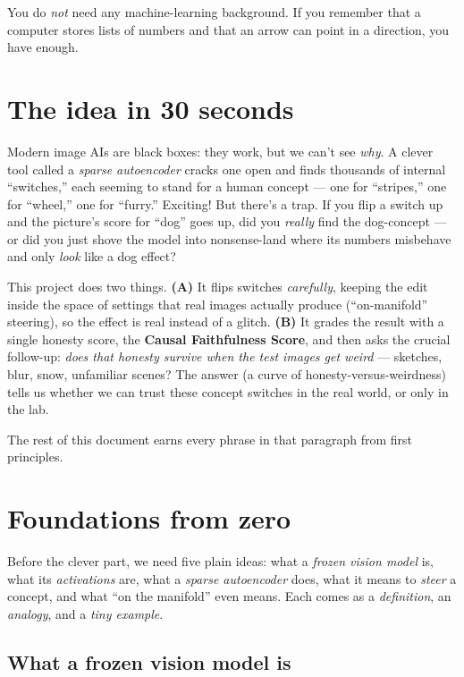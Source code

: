 \documentclass[12pt]{article}
\begin{document}
You do \emph{not} need any machine-learning background. If you remember that a computer stores lists of numbers and that an arrow can point in a direction, you have enough.

\section{The idea in 30 seconds}

Modern image AIs are black boxes: they work, but we can't see \emph{why}. A clever tool called a \emph{sparse autoencoder} cracks one open and finds thousands of internal ``switches,'' each seeming to stand for a human concept --- one for ``stripes,'' one for ``wheel,'' one for ``furry.'' Exciting! But there's a trap. If you flip a switch up and the picture's score for ``dog'' goes up, did you \emph{really} find the dog-concept --- or did you just shove the model into nonsense-land where its numbers misbehave and only \emph{look} like a dog effect?

This project does two things. \textbf{(A)} It flips switches \emph{carefully}, keeping the edit inside the space of settings that real images actually produce (``on-manifold'' steering), so the effect is real instead of a glitch. \textbf{(B)} It grades the result with a single honesty score, the \textbf{Causal Faithfulness Score}, and then asks the crucial follow-up: \emph{does that honesty survive when the test images get weird} --- sketches, blur, snow, unfamiliar scenes? The answer (a curve of honesty-versus-weirdness) tells us whether we can trust these concept switches in the real world, or only in the lab.

The rest of this document earns every phrase in that paragraph from first principles.

\section{Foundations from zero}

Before the clever part, we need five plain ideas: what a \emph{frozen vision model} is, what its \emph{activations} are, what a \emph{sparse autoencoder} does, what it means to \emph{steer} a concept, and what ``on the manifold'' even means. Each comes as a \emph{definition}, an \emph{analogy}, and a \emph{tiny example}.

\subsection{What a frozen vision model is}
\end{document}
